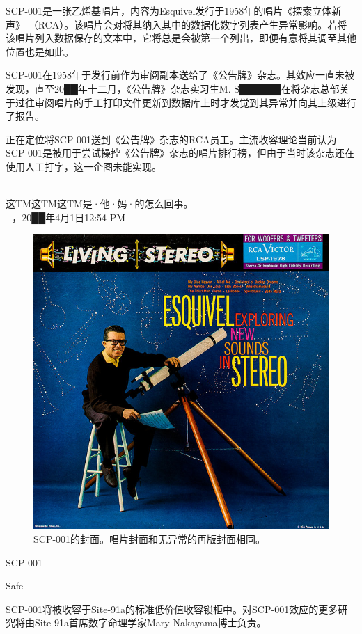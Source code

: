SCP-001是一张乙烯基唱片，内容为Esquivel发行于1958年的唱片《探索立体新声》 （RCA）。该唱片会对将其纳入其中的数据化数字列表产生异常影响。若将该唱片列入数据保存的文本中，它将总是会被第一个列出，即便有意将其调至其他位置也是如此。

SCP-001在1958年于发行前作为审阅副本送给了《公告牌》杂志。其效应一直未被发现，直至20██年十二月，《公告牌》杂志实习生M. S██████在将杂志总部关于过往审阅唱片的手工打印文件更新到数据库上时才发觉到其异常并向其上级进行了报告。

正在定位将SCP-001送到《公告牌》杂志的RCA员工。主流收容理论当前认为SCP-001是被用于尝试操控《公告牌》杂志的唱片排行榜，但由于当时该杂志还在使用人工打字，这一企图未能实现。


\newpage



\begin{scpbox}
 \\
这TM这TM这TM是·他·妈·的怎么回事。 \\
- ，20██年4月1日12:54 PM
\end{scpbox}

\begin{figure}[H]
	\centering
	\includegraphics[width=0.5\linewidth]{images/SCP.001.a.record.2.jpg}
	\caption*{SCP-001的封面。唱片封面和无异常的再版封面相同。}
\end{figure}

SCP-001

Safe

SCP-001将被收容于Site-91a的标准低价值收容锁柜中。对SCP-001效应的更多研究将由Site-91a首席数字命理学家Mary Nakayama博士负责。

